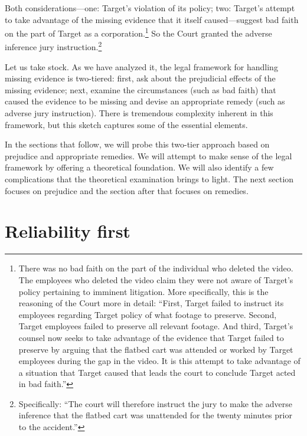\documentclass[
  10pt,
  dvipsnames,enabledeprecatedfontcommands]{scrartcl}
\begin{document}
\noindent Both considerations---one: Target's violation of its policy;
two: Target's attempt to take advantage of the missing evidence that it
itself caused---suggest bad faith on the part of Target as a
corporation.\footnote{There was no bad faith on the part of the
  individual who deleted the video. The employees who deleted the video
  claim they were not aware of Target's policy pertaining to imminent
  litigation. More specifically, this is the reasoning of the Court more
  in detail: ``First, Target failed to instruct its employees regarding
  Target policy of what footage to preserve. Second, Target employees
  failed to preserve all relevant footage. And third, Target's counsel
  now seeks to take advantage of the evidence that Target failed to
  preserve by arguing that the flatbed cart was attended or worked by
  Target employees during the gap in the video. It is this attempt to
  take advantage of a situation that Target caused that leads the court
  to conclude Target acted in bad faith.''} So the Court granted the
adverse inference jury instruction.\footnote{ Specifically: ``The court
  will therefore instruct the jury to make the adverse inference that
  the flatbed cart was unattended for the twenty minutes prior to the
  accident.''}

\vspace{4mm}

\noindent Let us take stock. As we have analyzed it, the legal framework
for handling missing evidence is two-tiered: first, ask about the
prejudicial effects of the missing evidence; next, examine the
circumstances (such as bad faith) that caused the evidence to be missing
and devise an appropriate remedy (such as adverse jury instruction).
There is tremendous complexity inherent in this framework, but this
sketch captures some of the essential elements.

In the sections that follow, we will probe this two-tier approach based
on prejudice and appropriate remedies. We will attempt to make sense of
the legal framework by offering a theoretical foundation. We will also
identify a few complications that the theoretical examination brings to
light. The next section focuses on prejudice and the section after that
focuses on remedies.

\hypertarget{reliability-first}{%
\section{Reliability first}\label{reliability-first}}
\end{document}
